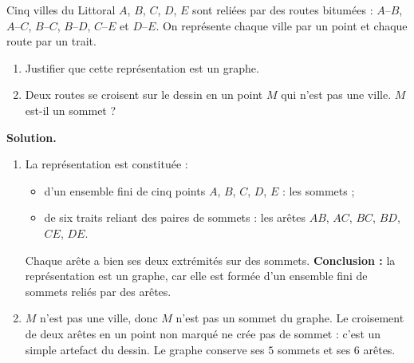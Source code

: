 \documentclass[11pt]{article}
\newcommand{\cle}[1]{{\popxbold\color{popdark}#1}}
\begin{document}
\begin{exoresolu}
Cinq villes du Littoral $A$, $B$, $C$, $D$, $E$ sont reliées par des routes bitumées : $A$--$B$, $A$--$C$, $B$--$C$, $B$--$D$, $C$--$E$ et $D$--$E$. On représente chaque ville par un point et chaque route par un trait.
\begin{enumerate}
\item Justifier que cette représentation est un graphe.
\item Deux routes se croisent sur le dessin en un point $M$ qui n'est pas une ville. $M$ est-il un sommet ?
\end{enumerate}
\tcblower
\textbf{Solution.}
\begin{enumerate}
\item La représentation est constituée :
\begin{itemize}
\item d'un ensemble fini de cinq points $A$, $B$, $C$, $D$, $E$ : les \cle{sommets} ;
\item de six traits reliant des paires de sommets : les \cle{arêtes} $AB$, $AC$, $BC$, $BD$, $CE$, $DE$.
\end{itemize}
Chaque arête a bien ses deux extrémités sur des sommets. \textbf{Conclusion :} la représentation est un graphe, car elle est formée d'un ensemble fini de sommets reliés par des arêtes.
\item $M$ n'est pas une ville, donc $M$ n'est pas un sommet du graphe. Le croisement de deux arêtes en un point non marqué ne crée pas de sommet : c'est un simple artefact du dessin. Le graphe conserve ses $5$ sommets et ses $6$ arêtes.
\end{enumerate}
\end{exoresolu}
\end{document}

